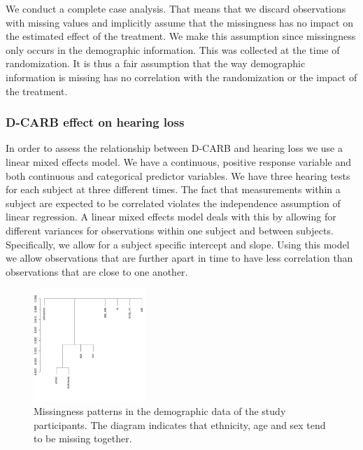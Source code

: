 \documentclass[paper=a4, fontsize=11pt]{scrartcl} %
\numberwithin{equation}{section} %
\numberwithin{figure}{section} %
\numberwithin{table}{section} %
\begin{document}
We conduct a complete case analysis. That means that we discard observations with missing values and implicitly assume that the missingness has no impact on the estimated effect of the treatment. We make this assumption since missingness only occurs in the demographic information. This was collected at the time of randomization. It is thus a fair assumption that the way demographic information is missing has no correlation with the randomization or the impact of the treatment.\\

\subsubsection{D-CARB effect on hearing loss}
\label{sec:methods_model_iii}
In order to assess the relationship between D-CARB and hearing loss we use a linear mixed effects model. We have a continuous, positive response variable and both continuous and categorical predictor variables. We have three hearing tests for each subject at three different times. The fact that measurements within a subject are expected to be correlated violates the independence assumption of linear regression. A linear mixed effects model deals with this by allowing for different variances for observations within one subject and between subjects. Specifically, we allow for a subject specific intercept and slope. Using this model we allow observations that are further apart in time to have less correlation than observations that are close to one another.\\

\begin{figure}
  \begin{center}
    \includegraphics[width=0.38\textwidth]{./rcode/plots/na_patterns}
  \end{center}
  \caption{Missingness patterns in the demographic data of the study participants. The diagram indicates that ethnicity, age and sex tend to be missing together.}
  \label{fig:na_patterns}
\end{figure}
\end{document}

